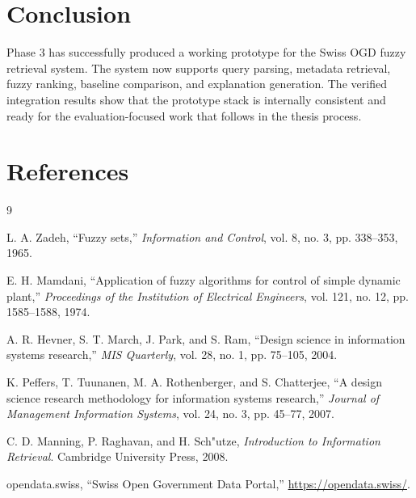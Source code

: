 \documentclass[11pt,a4paper]{article}
\begin{document}
\section{Conclusion}

Phase 3 has successfully produced a working prototype for the Swiss OGD fuzzy retrieval system. The system now supports query parsing, metadata retrieval, fuzzy ranking, baseline comparison, and explanation generation. The verified integration results show that the prototype stack is internally consistent and ready for the evaluation-focused work that follows in the thesis process.

\section{References}

\begin{thebibliography}{9}

L. A. Zadeh, ``Fuzzy sets,'' \emph{Information and Control}, vol. 8, no. 3, pp. 338--353, 1965.

E. H. Mamdani, ``Application of fuzzy algorithms for control of simple dynamic plant,'' \emph{Proceedings of the Institution of Electrical Engineers}, vol. 121, no. 12, pp. 1585--1588, 1974.

A. R. Hevner, S. T. March, J. Park, and S. Ram, ``Design science in information systems research,'' \emph{MIS Quarterly}, vol. 28, no. 1, pp. 75--105, 2004.

K. Peffers, T. Tuunanen, M. A. Rothenberger, and S. Chatterjee, ``A design science research methodology for information systems research,'' \emph{Journal of Management Information Systems}, vol. 24, no. 3, pp. 45--77, 2007.

C. D. Manning, P. Raghavan, and H. Sch{"u}tze, \emph{Introduction to Information Retrieval}. Cambridge University Press, 2008.

opendata.swiss, ``Swiss Open Government Data Portal,'' \url{https://opendata.swiss/}.

\end{thebibliography}
\end{document}
